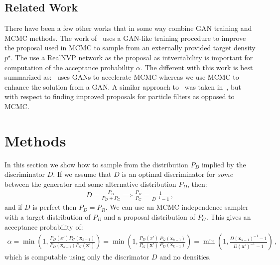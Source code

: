 \documentclass{article}
\renewcommand{\vec}[1]{{\boldsymbol{\mathbf{#1}}}} %
\newcommand{\target}{{p^\star}}
\begin{document}
\subsection{Related Work}

There have been a few other works that in some way combine GAN training and MCMC methods.
The work of~\citet{} uses a GAN-like training procedure to improve the proposal used in MCMC to sample from an externally provided target density $\target$.
The use a RealNVP network as the proposal as intvertability is important for computation of the acceptance probability $\alpha$.
The different with this work is best summarized as:~\citet{} uses GANs to accelerate MCMC whereas we use MCMC to enhance the solution from a GAN.
A similar approach to~\citet{} was taken in~\citet{}, but with respect to finding improved proposals for particle filters as opposed to MCMC\@.

\section{Methods}

In this section we show how to sample from the distribution $P_D$ implied by the discriminator $D$.
If we assume that $D$ is an optimal discriminator for \emph{some} between the generator and some alternative distribution $P_D$, then:
\begin{align}
  D = \frac{P_D}{P_D + P_G} \implies \frac{P_D}{P_G} = \frac{1}{D^{-1}-1}\,, \label{eq:PD def}
\end{align}
and if $D$ is perfect then $P_D = P_R$.
We can use an MCMC independence sampler with a target distribution of $P_D$ and a proposal distribution of $P_G$.
This gives an acceptance probability of:
\begin{align}
  \alpha = \min(1, \frac{P_D(x')P_G(\vec x_{k-1})}{P_D(\vec x_{k-1})P_G(\vec x')})
    = \min(1, \frac{P_D(x')}{P_G(\vec x')} \frac{P_G(\vec x_{k-1})}{P_D(\vec x_{k-1})})
    = \min(1, \frac{D(\vec x_{k-1})^{-1} - 1}{D(\vec x')^{-1} - 1})\,, \label{eq:alpha from D}
\end{align}
which is computable using only the discrimator $D$ and no densities.
\end{document}
